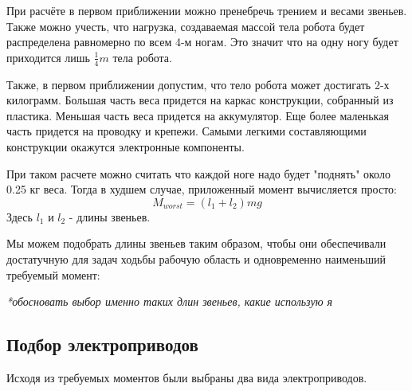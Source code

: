 При расчёте в первом приближении можно пренебречь трением и весами звеньев. Также можно учесть, что нагрузка, создаваемая массой тела робота будет распределена равномерно по всем 4-м ногам. Это значит что на одну ногу будет приходится лишь $\frac{1}{4}m$ тела робота.

Также, в первом приближении допустим, что тело робота может достигать 2-х килограмм. Большая часть веса придется на каркас конструкции, собранный из пластика. Меньшая часть веса придется на аккумулятор. Еще более маленькая часть придется на проводку и крепежи. Самыми легкими составляющими конструкции окажутся электронные компоненты.

При таком расчете можно считать что каждой ноге надо будет "поднять" около 0.25 кг веса. Тогда в худшем случае, приложенный момент вычисляется просто:
$$ M_{worst}=(l_{1}+l_{2}) m g $$
Здесь $l_1$ и $l_2$ - длины звеньев.

Мы можем подобрать длины звеньев таким образом, чтобы они обеспечивали достатучную для задач ходьбы рабочую область и одновременно наименьший требуемый момент:

\textit{*обосновать выбор именно таких длин звеньев, какие использую я}

\subsection{Подбор электроприводов}

Исходя из требуемых моментов были выбраны два вида электроприводов.